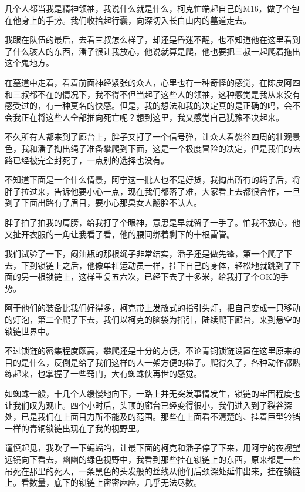 几个人都当我是精神领袖，我说什么就是什么，柯克忙端起自己的M16，做了个包在他身上的手势。我们收拾起行囊，向深切入长白山内的墓道走去。

我跟在队伍的最后，去看三叔怎么样了，却还是昏迷不醒，也不知道他在这里看到了什么骇人的东西，潘子很让我放心，他说就算是爬，他也要把三叔一起爬着拖出这个鬼地方。

在墓道中走着，看着前面神经紧张的众人，心里也有一种奇怪的感觉，在陈皮阿四和三叔都不在的情况下，我不得不但当起了这些人的领袖，这种感觉是我从来没有感受过的，有一种莫名的快感。但是，我的想法和我的决定真的是正确的吗，会不会我正在将这些人全部推向死亡呢？想到这里，我又感觉自己犹豫不决起来。

不久所有人都来到了廊台上，胖子又打了一个信号弹，让众人看裂谷四周的壮观景色，我和潘子掏出绳子准备攀爬到下面，这是一个极度冒险的决定，但是我们的去路已经被完全封死了，一点别的选择也没有。

不知道下面是一个什么情景，阿宁这一批人也不是好货，我掏出所有的绳子后，将胖子拉过来，告诉他要小心一点，现在我们都落了难，大家看上去都很合作，一旦到了下面出路有了眉目，要小心那臭女人翻脸不认人。

胖子拍了拍我的肩膀，给我打了个眼神，意思是早就留子一手了。怕我不放心，他又扯开衣服的一角让我看了看，他的腰间绑着剩下的十根雷管。

我们试验了一下，闷油瓶的那根绳子非常结实，潘子还是做先锋，第一个爬了下去，下到锁链上之后，他像单杠运动员一样，挂下自己的身体，轻松地就跳到了下面的另一根锁链上，这样重复五六次，已经下去了十多米，给我打了个OK的手势。

阿于他们的装备比我们好得多，柯克带上发散式的指引头灯，把自己变成一只移动的灯泡，第二个爬了下去，我们以柯克的脑袋为指引，陆续爬下廊台，来到悬空的锁链世界中。

不过锁链的密集程度颇高，攀爬还是十分的方便，不论青铜锁链设置在这里原来的目的是什么，反倒是给了我们这样的人一架方便的梯子。爬得久了，各种动作都熟练起来，也掌握了一些窍门，大有蜘蛛侠再世的感觉。

如蜘蛛一般，十几个人缓慢地向下，一路上并无突发事情发生，锁链的牢固程度也让我们叹为观止。四个小时后，头顶的廊台已经变得很小，我们进入到了裂谷深处，已是我们在上面目力所不能及的范围。那些在上面看不清楚的、挂着巨型铃铛一样的青铜锁链出现在了我的视野里。

谨慎起见，我吹了一下蝙蝠哨，让最下面的柯克和潘子停了下来，用阿宁的夜视望远镜向下看去，幽幽的绿色视野中，我看到那些挂在锁链上的东西，原来都是一些吊死在那里的死人，一条黑色的头发般的丝线从他们后颈深处延伸出来，挂在锁链上。看数量，底下的锁链上密密麻麻，几乎无法尽数。

